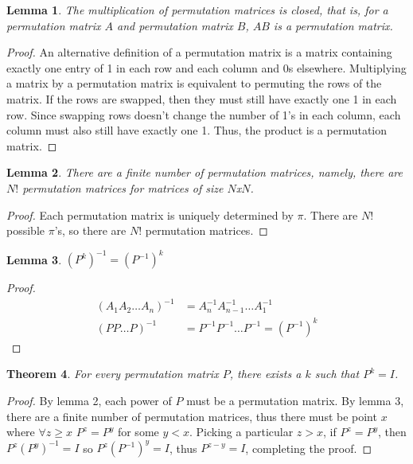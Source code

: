 \documentclass[11pt, oneside]{article}
\theoremstyle{plain}
\newtheorem{theorem}{Theorem}[section]
\newtheorem{lemma}[theorem]{Lemma}
\begin{document}
\newpage

\begin{lemma}
The multiplication of permutation matrices is closed,
that is, for a permutation matrix \( A \) and permutation
matrix \( B \), \( AB \) is a permutation matrix.
\end{lemma}

\begin{proof}
An alternative definition of a permutation matrix is a matrix containing
exactly one entry of 1 in each row and each column and 0s elsewhere.
Multiplying a matrix by a permutation matrix is equivalent to permuting
the rows of the matrix. If the rows are swapped, then they must still
have exactly one 1 in each row. Since swapping rows doesn't change the
number of 1's in each column, each column must also still have exactly
one 1. Thus, the product is a permutation matrix.
\end{proof}

\begin{lemma}
There are a finite number of permutation matrices, namely, there are
\( N! \) permutation matrices for matrices of size \( N \)x\( N \).
\end{lemma}

\begin{proof}
Each permutation matrix is uniquely determined by \( \pi \). There are \(
N! \) possible \( \pi \)'s, so there are \( N! \) permutation matrices.
\end{proof}

\begin{lemma}
\( (P^k)^{-1} = (P^{-1})^k \)
\end{lemma}

\begin{proof}
\begin{align*}
(A_1 A_2 \dots A_n)^{-1} &= A_n^{-1} A_{n - 1}^{-1} \dots A_1^{-1} \\
(P P \dots P)^{-1} &= P^{-1} P^{-1} \dots P^{-1} = (P^{-1})^k
\end{align*}
\end{proof}

\begin{theorem}
For every permutation matrix \( P \), there exists a \( k \) such that \( P^k = I \).
\end{theorem}

\begin{proof}
By lemma 2, each power of \( P \) must be a permutation matrix.
By lemma 3, there are a finite number of permutation matrices, thus
there must be point \( x \) where \( \forall z \geq x \) \( P^z = P^y \)
for some \( y < x \). Picking a particular \( z > x \), if \( P^z = P^y \), then \( P^z (P^y)^{-1} = I \)
so \( P^z (P^{-1})^y = I \), thus \( P^{z - y} = I \), completing the proof.
\end{proof}
\end{document}

